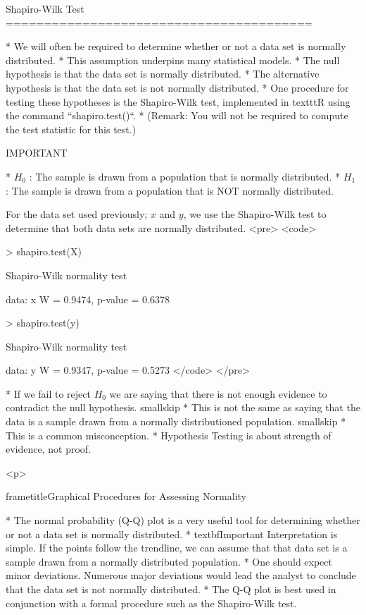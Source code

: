 Shapiro-Wilk Test 
========================================


 * We will often be required to determine whether or not a data set is normally distributed.
 * This assumption underpins many statistical models.
 * The null hypothesis is that the data set is normally distributed.
 * The alternative hypothesis is that the data set is not normally distributed.
 * One procedure for testing these hypotheses is the Shapiro-Wilk test, implemented in texttt{R} using the command ``shapiro.test()``.
 * (Remark: You will not be required to compute the test statistic for this test.)

IMPORTANT

 * $H_0$ : The sample is drawn from a population that is normally distributed. 
 * $H_1$ : The sample is drawn from a population that is NOT normally distributed. 




For the data set used previously; $x$ and $y$, we use the Shapiro-Wilk test to determine that both data sets are normally distributed.
<pre>
<code>

> shapiro.test(X)

        Shapiro-Wilk normality test

data:  x
W = 0.9474, p-value = 0.6378

> shapiro.test(y)

        Shapiro-Wilk normality test

data:  y
W = 0.9347, p-value = 0.5273
</code>
</pre>


 * If we fail to reject $H_0$ we are saying that there is not enough evidence to contradict the null hypothesis. smallskip
 * This is not the same as saying that the data is a sample drawn from a normally distributioned population. smallskip
 * This is a common misconception.
 * Hypothesis Testing is about strength of evidence, not proof.

<p>

frametitle{Graphical Procedures for Assessing Normality}


 * The normal probability (Q-Q) plot is a very useful tool for determining whether or not a data set is normally distributed.
 * textbf{Important} Interpretation is simple. If the points follow the trendline, we can assume that that data set is a sample drawn from a normally distributed population.
 * One should expect minor deviations. Numerous major deviations would lead the analyst to conclude that the data set is not normally distributed.
 * The Q-Q plot is best used in conjunction with a formal procedure such as the Shapiro-Wilk test.


